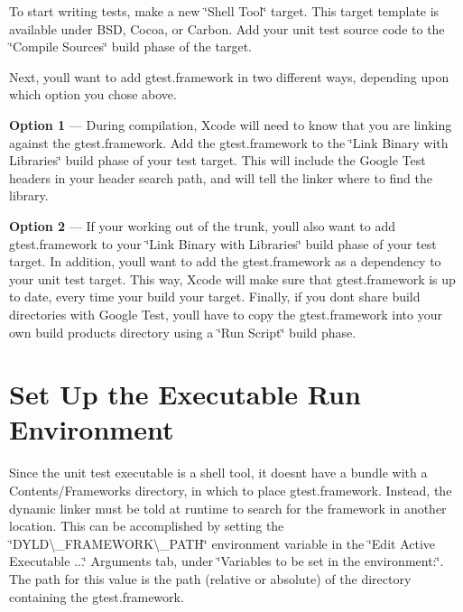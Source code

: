 To start writing tests, make a new \char`\"{}\+Shell Tool\char`\"{} target. This target template is available under B\+SD, Cocoa, or Carbon. Add your unit test source code to the \char`\"{}\+Compile Sources\char`\"{} build phase of the target.

Next, you\textquotesingle{}ll want to add gtest.\+framework in two different ways, depending upon which option you chose above.


\begin{DoxyItemize}
\item {\bfseries{Option 1}} --- During compilation, Xcode will need to know that you are linking against the gtest.\+framework. Add the gtest.\+framework to the \char`\"{}\+Link Binary with Libraries\char`\"{} build phase of your test target. This will include the Google Test headers in your header search path, and will tell the linker where to find the library.
\item {\bfseries{Option 2}} --- If your working out of the trunk, you\textquotesingle{}ll also want to add gtest.\+framework to your \char`\"{}\+Link Binary with Libraries\char`\"{} build phase of your test target. In addition, you\textquotesingle{}ll want to add the gtest.\+framework as a dependency to your unit test target. This way, Xcode will make sure that gtest.\+framework is up to date, every time your build your target. Finally, if you don\textquotesingle{}t share build directories with Google Test, you\textquotesingle{}ll have to copy the gtest.\+framework into your own build products directory using a \char`\"{}\+Run Script\char`\"{} build phase.
\end{DoxyItemize}

\section*{Set Up the Executable Run Environment}

Since the unit test executable is a shell tool, it doesn\textquotesingle{}t have a bundle with a {\ttfamily Contents/\+Frameworks} directory, in which to place gtest.\+framework. Instead, the dynamic linker must be told at runtime to search for the framework in another location. This can be accomplished by setting the \char`\"{}\+D\+Y\+L\+D\textbackslash{}\+\_\+\+F\+R\+A\+M\+E\+W\+O\+R\+K\textbackslash{}\+\_\+\+P\+A\+T\+H\char`\"{} environment variable in the \char`\"{}\+Edit Active Executable ...\char`\"{} Arguments tab, under \char`\"{}\+Variables to be set in the environment\+:\char`\"{}. The path for this value is the path (relative or absolute) of the directory containing the gtest.\+framework.


